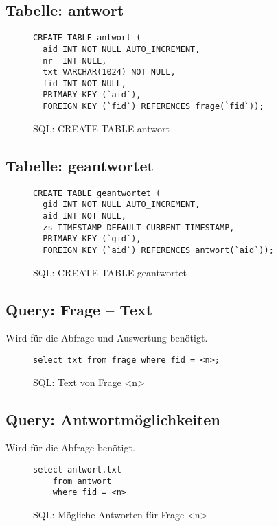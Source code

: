 \subsection{Tabelle: antwort}
\begin{figure}[h]
\begin{verbatim}
CREATE TABLE antwort (
  aid INT NOT NULL AUTO_INCREMENT,
  nr  INT NULL,
  txt VARCHAR(1024) NOT NULL,
  fid INT NOT NULL,
  PRIMARY KEY (`aid`),
  FOREIGN KEY (`fid`) REFERENCES frage(`fid`));
\end{verbatim}
\caption{SQL: CREATE TABLE antwort}
\label{sql:tblantwort}
\end{figure}

\subsection{Tabelle: geantwortet}
\begin{figure}[h]
\begin{verbatim}
CREATE TABLE geantwortet (
  gid INT NOT NULL AUTO_INCREMENT,
  aid INT NOT NULL,
  zs TIMESTAMP DEFAULT CURRENT_TIMESTAMP,
  PRIMARY KEY (`gid`),
  FOREIGN KEY (`aid`) REFERENCES antwort(`aid`));
\end{verbatim}
\caption{SQL: CREATE TABLE geantwortet}
\label{sql:tblgeantwortet}
\end{figure}

\subsection{Query: Frage -- Text}
Wird für die Abfrage und Auswertung benötigt.

\begin{figure}[h]
\begin{verbatim}
select txt from frage where fid = <n>;
\end{verbatim}
\caption{SQL: Text von Frage <n>}
\label{sql:qfragetxt}
\end{figure}

\subsection{Query: Antwortmöglichkeiten}
Wird für die Abfrage benötigt.

\begin{figure}[h]
\begin{verbatim}
select antwort.txt
	from antwort
	where fid = <n> 
\end{verbatim}
\caption{SQL: Mögliche Antworten für Frage <n>}
\label{sql:qantwnum}
\end{figure}


